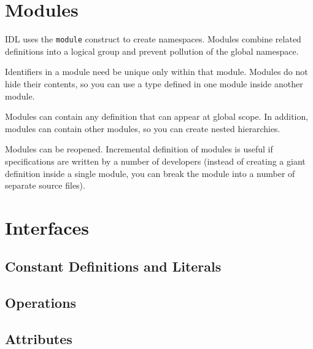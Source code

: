 \newpage
\section{Modules}
IDL uses the {\tt module} construct to create namespaces.
Modules combine related definitions into a logical group and prevent pollution
of the global namespace.

Identifiers in a module need be unique only within that module.
Modules do not hide their contents, so you can use a type defined in one module
inside another module.

Modules can contain any definition that can appear at global scope.
In addition, modules can contain other modules, so you can create nested
hierarchies. 

Modules can be reopened. 
Incremental definition of modules is useful if specifications are written by a
number of developers (instead of creating a giant definition inside a single
module, you can break the module into a number of separate source files).




\newpage
\section{Interfaces}

\subsection{Constant Definitions and Literals}

\subsection{Operations}

\subsection{Attributes}

